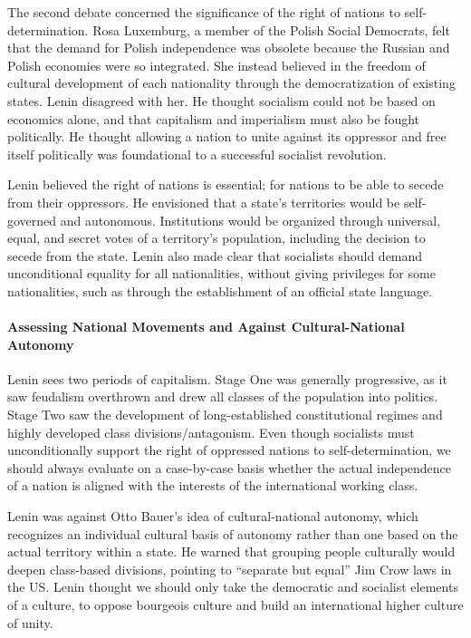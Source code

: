 The second debate concerned the significance of the right of nations to self-determination. Rosa Luxemburg, a member of the Polish Social Democrats, felt that the demand for Polish independence was obsolete because the Russian and Polish economies were so integrated. She instead believed in the freedom of cultural development of each nationality through the democratization of existing states. Lenin disagreed with her. He thought socialism could not be based on economics alone, and that capitalism and imperialism must also be fought politically. He thought allowing a nation to unite against its oppressor and free itself politically was foundational to a successful socialist revolution.

Lenin believed the right of nations is essential; for nations to be able to secede from their oppressors. He envisioned that a state's territories would be self-governed and autonomous. Institutions would be organized through universal, equal, and secret votes of a territory's population, including the decision to secede from the state. Lenin also made clear that socialists should demand unconditional equality for all nationalities, without giving privileges for some nationalities, such as through the establishment of an official state language.

\paragraph{Assessing National Movements and Against Cultural-National Autonomy}

Lenin sees two periods of capitalism. Stage One was generally progressive, as it saw feudalism overthrown and drew all classes of the population into politics. Stage Two saw the development of long-established constitutional regimes and highly developed class divisions/antagonism. Even though socialists must unconditionally support the right of oppressed nations to self-determination, we should always evaluate on a case-by-case basis whether the actual independence of a nation is aligned with the interests of the international working class.

Lenin was against Otto Bauer's idea of cultural-national autonomy, which recognizes an individual cultural basis of autonomy rather than one based on the actual territory within a state. He warned that grouping people culturally would deepen class-based divisions, pointing to ``separate but equal'' Jim Crow laws in the US. Lenin thought we should only take the democratic and socialist elements of a culture, to oppose bourgeois culture and build an international higher culture of unity.

